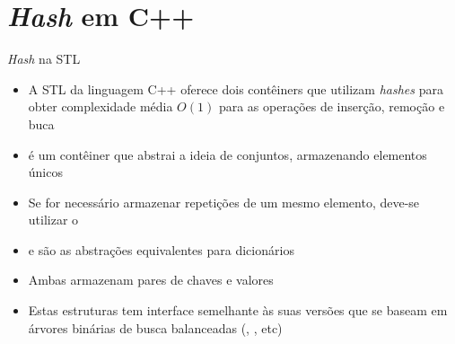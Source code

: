 \section{{\it Hash} em C++}

\begin{frame}[fragile]{{\it Hash} na STL}

    \begin{itemize}
        \item A STL da linguagem C++ oferece dois contêiners que utilizam \textit{hashes}
            para obter complexidade média $O(1)$ para as operações de inserção, remoção e
            buca

        \item {} é um contêiner que abstrai a ideia de conjuntos,
            armazenando elementos únicos

        \item Se for necessário armazenar repetições de um mesmo elemento, deve-se utilizar o

        \item {} e  são as abstrações
            equivalentes para dicionários

        \item Ambas armazenam pares de chaves e valores

        \item Estas estruturas tem interface semelhante às suas versões que se baseam em
            árvores binárias de busca balanceadas (, , etc)
    \end{itemize}

\end{frame}
